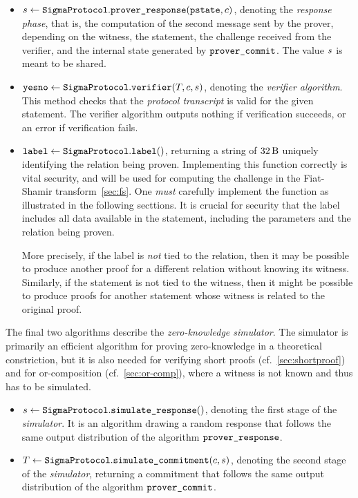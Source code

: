 \documentclass[11pt]{article}
\begin{document}
\begin{itemize}
        \item
          $s \gets \texttt{SigmaProtocol}.\texttt{prover\_response}(\texttt{pstate}, c)$,
          denoting the \emph{response phase}, that is, the computation of the second message sent by the prover, depending on the witness, the statement, the challenge received from the verifier, and the internal state generated by $\texttt{prover\_commit}$.
          The value $s$ is meant to be shared.
        \item $\texttt{yesno} \gets \texttt{SigmaProtocol}.\texttt{verifier}(T, c, s)$,
          denoting the \emph{verifier algorithm}. This method checks that
          the \emph{protocol transcript} is valid for the given statement.
          The verifier algorithm outputs nothing if verification succeeds,
          or an error if verification fails.
          \item $\texttt{label} \gets\texttt{SigmaProtocol}.\texttt{label}()$,
          returning a string of $\seedlen$ uniquely identifying the relation being proven.
          Implementing this function correctly is vital security, and will be used for computing the challenge in the Fiat-Shamir transform~\cref{sec:fs}.
          One \emph{must} carefully implement the function as illustrated in the following secttions. It is crucial for security that the label includes all data available in the statement, including the parameters and the relation being proven.

          More precisely, if the label is \emph{not} tied to the relation, then it may be possible to produce another proof for a different relation without knowing its witness.
          Similarly, if the statement is not tied to the witness, then it might be possible to produce proofs
          for another statement whose witness is related to the original proof.
      \end{itemize}
      The final two algorithms describe the \emph{zero-knowledge simulator}.
      The simulator is primarily an efficient algorithm for proving zero-knowledge in a theoretical constriction, but it is also needed for verifying short proofs (cf.~\cref{sec:shortproof}) and for or-composition (cf.~\cref{sec:or-comp}), where a witness is not known and thus has to be simulated.
      \begin{itemize}
        \item $s \gets \texttt{SigmaProtocol}.\texttt{simulate\_response}()$,
        denoting the first stage of the \emph{simulator}. It is an algorithm drawing a random response that follows the same output distribution of the algorithm $\texttt{prover\_response}$.
        \item $T \gets \texttt{SigmaProtocol}.\texttt{simulate\_commitment}(c, s)$, denoting the second stage of the \emph{simulator}, returning a commitment that follows the same output distribution of the algorithm $\texttt{prover\_commit}$.
      \end{itemize}
\end{document}
